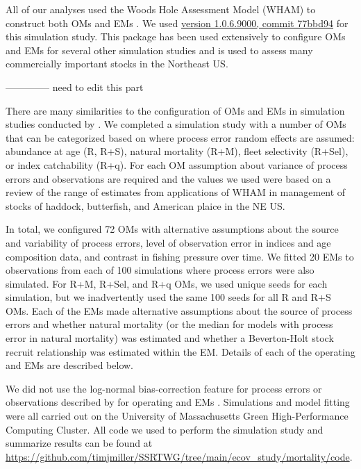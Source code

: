 \documentclass[
  12pt,
]{article}
\begin{document}
All of our analyses used the Woods Hole Assessment Model (WHAM) to construct both OMs and EMs \citep{millerstock20, stockmiller21, milleretal_inreview1}. We used \href{https://github.com/timjmiller/wham/tree/77bbd946e4881216a439933473d1c58b21c270c3}{version 1.0.6.9000, commit 77bbd94} for this simulation study. This package has been used extensively to configure OMs and EMs for several other simulation studies \citep[\citet{lietalinreview}]{legaultetal23, lietal24} and is used to assess many commercially important stocks in the Northeast US.

-------------- need to edit this part

There are many similarities to the configuration of OMs and EMs in simulation studies conducted by \citet{milletetelinreview}. We completed a simulation study with a number of OMs that can be categorized based on where process error random effects are assumed: abundance at age (R, R+S), natural mortality (R+M), fleet selectivity (R+Sel), or index catchability (R+q). For each OM assumption about variance of process errors and observations are required and the values we used were based on a review of the range of estimates from applications of WHAM in management of stocks of haddock, butterfish, and American plaice in the NE US.

In total, we configured 72 OMs with alternative assumptions about the source and variability of process errors, level of observation error in indices and age composition data, and contrast in fishing pressure over time. We fitted 20 EMs to observations from each of 100 simulations where process errors were also simulated. For R+M, R+Sel, and R+q OMs, we used unique seeds for each simulation, but we inadvertently used the same 100 seeds for all R and R+S OMs. Each of the EMs made alternative assumptions about the source of process errors and whether natural mortality (or the median for models with process error in natural mortality) was estimated and whether a Beverton-Holt stock recruit relationship was estimated within the EM. Details of each of the operating and EMs are described below.

We did not use the log-normal bias-correction feature for process errors or observations described by \citet{stockmiller21} for operating and EMs \citep{lietalinreview}. Simulations and model fitting were all carried out on the University of Massachusetts Green High-Performance Computing Cluster. All code we used to perform the simulation study and summarize results can be found at \url{https://github.com/timjmiller/SSRTWG/tree/main/ecov_study/mortality/code}.
\end{document}
